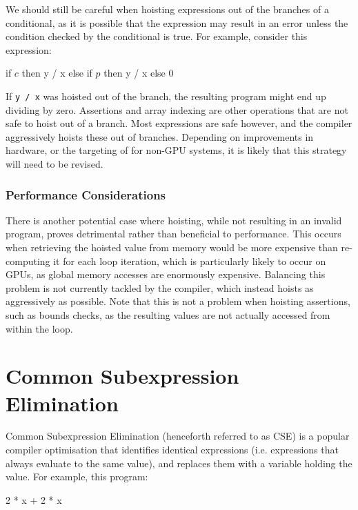 We should still be careful when hoisting expressions out of the
branches of a conditional, as it is possible that the expression may
result in an error unless the condition checked by the conditional is
true.  For example, consider this expression:

\begin{colorcode}
if \(c\) then y / x
     else if \(p\) then y / x
               else 0
\end{colorcode}

If \texttt{y / x} was hoisted out of the branch, the resulting program
might end up dividing by zero.  Assertions and array indexing are
other operations that are not safe to hoist out of a branch.  Most
expressions are safe however, and the \LO{} compiler aggressively
hoists these out of branches.  Depending on improvements in hardware,
or the targeting of \LO{} for non-GPU systems, it is likely that this
strategy will need to be revised.

\subsubsection{Performance Considerations}

There is another potential case where hoisting, while not resulting in
an invalid program, proves detrimental rather than beneficial to
performance.  This occurs when retrieving the hoisted value from
memory would be more expensive than re-computing it for each loop
iteration, which is particularly likely to occur on GPUs, as global
memory accesses are enormously expensive.  Balancing this problem is
not currently tackled by the \LO{} compiler, which instead hoists as
aggressively as possible.  Note that this is not a problem when
hoisting assertions, such as bounds checks, as the resulting values
are not actually accessed from within the loop.

\section{Common Subexpression Elimination}
\label{sec:cse}

Common Subexpression Elimination (henceforth referred to as CSE) is a
popular compiler optimisation that identifies identical expressions
(i.e. expressions that always evaluate to the same value), and
replaces them with a variable holding the value.  For example, this
program:

\begin{colorcode}
2 * x + 2 * x
\end{colorcode}

